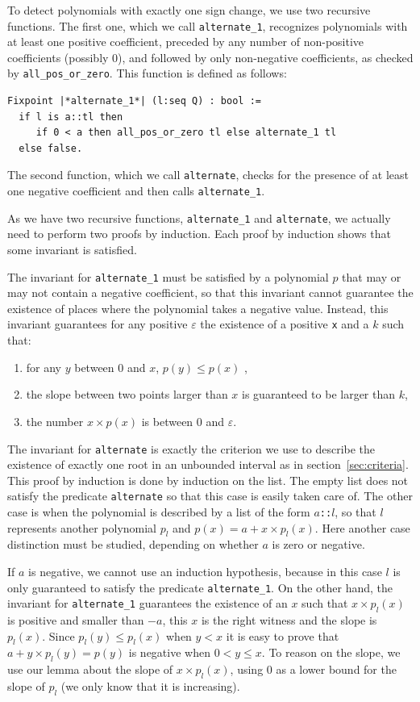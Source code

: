 \documentclass{mscs}
\begin{document}
To detect polynomials with exactly one sign change, we use two recursive
functions.  The first one, which we call {\tt alternate\_1}, recognizes
polynomials with at least one positive coefficient, preceded by any number
of non-positive coefficients (possibly 0), and followed by only non-negative
coefficients, as checked by {\tt all\_pos\_or\_zero}.  This function is
defined as follows:
\begin{lstlisting}
Fixpoint |*alternate_1*| (l:seq Q) : bool :=
  if l is a::tl then
     if 0 < a then all_pos_or_zero tl else alternate_1 tl
  else false.
\end{lstlisting}
The second function, which we call {\tt alternate}, checks for the
presence of at least one negative coefficient and then calls {\tt alternate\_1}.

As we have two recursive functions, {\tt alternate\_1} and {\tt alternate},
we actually need to perform two proofs by induction.  Each proof by induction
shows that some invariant is satisfied.

The invariant for {\tt alternate\_1}
must be satisfied by a polynomial \(p\) that may or may not contain a negative
coefficient, so that this invariant cannot guarantee the existence of
places where the polynomial takes a negative value.  Instead, this invariant
guarantees for any positive \(\varepsilon\) the existence of a positive {\tt x}
and a \(k\) such that:
\begin{enumerate}
\item for any \(y\) between \(0\) and \(x\), \(p(y) \leq p (x)\) ,
\item the slope between two points larger than \(x\) is guaranteed to be larger
than \(k\),
\item the number \(x \times p(x)\) is between \(0\) and \(\varepsilon\).
\end{enumerate}

The invariant for {\tt alternate} is exactly the criterion we use
to describe the existence of exactly one root in an unbounded
interval as in section~\ref{sec:criteria}.
This proof by induction is done by induction on the list.  The empty list
does not satisfy the predicate {\tt alternate} so that this case is
easily taken care of.  The other case is when the polynomial is described
by a list of the form {\tt \(a\)::\(l\)}, so that \(l\) represents another polynomial
\(p_l\) and \(p(x) = a + x \times p_l(x)\).  Here another case distinction must be
studied, depending on whether \(a\) is zero or negative.

If \(a\) is negative, we cannot use an induction hypothesis, because in
this case \(l\) is only guaranteed to satisfy the predicate
{\tt alternate\_1}.  On the other hand, the invariant for {\tt alternate\_1}
guarantees the existence of an \(x\) such that \(x\times p_l(x)\) is positive
and smaller than \(-a\), this \(x\) is the right witness and the slope is
\(p_l(x)\).  Since \(p_l(y) \leq p_l(x)\) when \(y< x\) it is easy to
prove that \(a+y\times p_l(y)=p(y)\) is negative when \(0 < y \leq x\).  To reason on the slope, we use our lemma about the
slope of \(x \times p_l(x)\), using \(0\) as a lower bound for the slope of \(p_l\) (we only
know that it is increasing).
\end{document}
